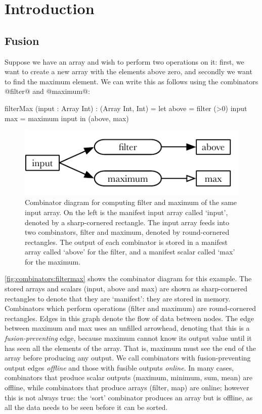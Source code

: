 \chapter{Introduction}
\label{C:introduction}


\section{Fusion}

Suppose we have an array and wish to perform two operations on it: first, we want to create a new array with the elements above zero, and secondly we want to find the maximum element.
We can write this as follows using the combinators @filter@ and @maximum@:

\begin{code}
filterMax (input : Array Int) : (Array Int, Int)
 = let above = filter (>0) input
       max   = maximum     input
   in (above, max)
\end{code}

\begin{figure}
\center
\includegraphics{figs/combinators/filtermax.pdf}
\caption[Combinator diagram for filterMax]
{Combinator diagram for computing filter and maximum of the same input array.
On the left is the manifest input array called `input', denoted by a sharp-cornered rectangle.
The input array feeds into two combinators, filter and maximum, denoted by round-cornered rectangles.
The output of each combinator is stored in a manifest array called `above' for the filter, and a manifest scalar called `max' for the maximum.}
\label{fig:combinators:filtermax}
\end{figure}


\autoref{fig:combinators:filtermax} shows the combinator diagram for this example.
The stored arrays and scalars (input, above and max) are shown as sharp-cornered rectangles to denote that they are `manifest': they are stored in memory.
Combinators which perform operations (filter and maximum) are round-cornered rectangles.
Edges in this graph denote the flow of data between nodes.
The edge between maximum and max uses an unfilled arrowhead, denoting that this is a \emph{fusion-preventing} edge, because maximum cannot know its output value until it has seen all the elements of the array.
That is, maximum must see the end of the array before producing any output.
We call combinators with fusion-preventing output edges \emph{offline} and those with fusible outputs \emph{online}.
In many cases, combinators that produce scalar outputs (maximum, minimum, sum, mean) are offline, while combinators that produce arrays (filter, map) are online; however this is not always true: the `sort' combinator produces an array but is offline, as all the data needs to be seen before it can be sorted.


